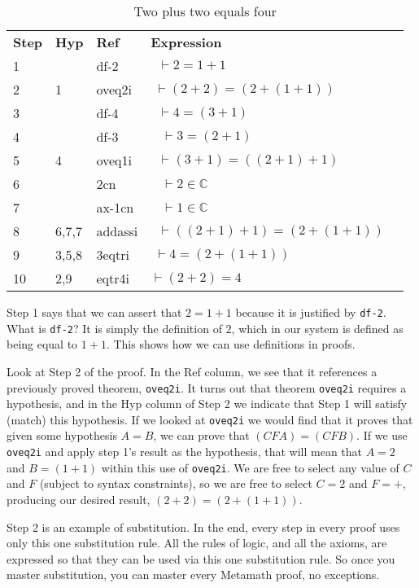 \begin{table}[!htbp]
\caption{Two plus two equals four}
\begin{tabular}{lllll}
\textbf{Step} & \textbf{Hyp} & \textbf{Ref} & \textbf{Expression} & \\
1  &       & df-2    & $ \; \; \vdash 2 = 1 + 1$  & \\
2  & 1     & oveq2i  & $ \; \vdash (2 + 2) = (2 + (1 + 1))$ & \\
3  &       & df-4    & $ \; \; \vdash 4 = (3 + 1)$ & \\
4  &       & df-3    & $ \; \; \; \vdash 3 = (2 + 1)$ & \\
5  & 4     & oveq1i  & $ \; \; \vdash (3 + 1) = ((2 + 1) + 1)$ & \\
6  &       & 2cn     & $ \; \; \; \vdash 2 \in \mathbb{C}$ & \\
7  &       & ax-1cn  & $ \; \; \; \vdash 1 \in \mathbb{C}$ & \\
8  & 6,7,7 & addassi & $ \; \; \vdash ((2 + 1) + 1) = (2 + (1 + 1))$ & \\
9  & 3,5,8 & 3eqtri  & $ \; \vdash 4 = (2 + (1 + 1))$ & \\
10 & 2,9   & eqtr4i  & $ \vdash (2 + 2) = 4$ & \\
\end{tabular}
\end{table}

Step 1 says that we can assert that $2 = 1 + 1$ because it is
justified by \texttt{df-2}.
What is \texttt{df-2}?
It is simply the definition of $2$, which in our system is defined as being
equal to $1 + 1$.  This shows how we can use definitions in proofs.

Look at Step 2 of the proof. In the Ref column, we see that it references
a previously proved theorem, \texttt{oveq2i}.
It turns out that
theorem \texttt{oveq2i} requires a
hypothesis, and in the Hyp column of Step 2 we indicate that Step 1 will
satisfy (match) this hypothesis.
If we looked at \texttt{oveq2i}
we would find that it proves that given some hypothesis
$A = B$, we can prove that $( C F A ) = ( C F B )$.
If we use \texttt{oveq2i} and apply step 1's result as the hypothesis,
that will mean that $A = 2$ and $B = ( 1 + 1 )$ within this use of
\texttt{oveq2i}.
We are free to select any value of $C$ and $F$ (subject to syntax constraints),
so we are free to select $C = 2$ and $F = +$,
producing our desired result,
$ (2 + 2) = (2 + (1 + 1))$.

Step 2 is an example of substitution.
In the end, every step in every proof uses only this one substitution rule.
All the rules of logic, and all the axioms, are expressed so that
they can be used via this one substitution rule.
So once you master substitution, you can master every Metamath proof,
no exceptions.

